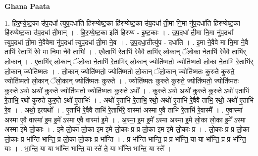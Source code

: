 \documentclass[17pt]{extarticle}
\begin{document}
\textbf{Ghana Paata } \newline

1. हि॒र॒ण्ये॒ष्ट॒का उ॑प॒दधा᳚ त्युप॒दधा॑ति हिरण्येष्ट॒का हि॑रण्येष्ट॒का उ॑प॒दधा॑ ती॒मा नि॒मा नु॑प॒दधा॑ति हिरण्येष्ट॒का हि॑रण्येष्ट॒का उ॑प॒दधा॑ ती॒मान् । . हि॒र॒ण्ये॒ष्ट॒का इति॑ हिरण्य - इ॒ष्ट॒काः । . उ॒प॒दधा॑ ती॒मा नि॒मा नु॑प॒दधा᳚ त्युप॒दधा॑ ती॒मा ने॒वैवेमा नु॑प॒दधा᳚ त्युप॒दधा॑ ती॒मा ने॒व । . उ॒प॒दधा॒तीत्यु॑प - दधा॑ति । . इ॒मा ने॒वैवे मा नि॒मा ने॒वै ताभि॑ रे॒ताभि॑ रे॒वे मा नि॒मा ने॒वै ताभिः॑ । . ए॒वैताभि॑ रे॒ताभि॑ रे॒वैवै ताभि॑र् लो॒कान् ॅलो॒का ने॒ताभि॑ रे॒वैवै ताभि॑र् लो॒कान् । . ए॒ताभि॑र् लो॒कान् ॅलो॒का ने॒ताभि॑ रे॒ताभि॑र् लो॒कान् ज्योति॑ष्मतो॒ ज्योति॑ष्मतो लो॒का ने॒ताभि॑ रे॒ताभि॑र् लो॒कान् ज्योति॑ष्मतः । . लो॒कान् ज्योति॑ष्मतो॒ ज्योति॑ष्मतो लो॒कान् ॅलो॒कान् ज्योति॑ष्मतः कुरुते कुरुते॒ ज्योति॑ष्मतो लो॒कान् ॅलो॒कान् ज्योति॑ष्मतः कुरुते । . ज्योति॑ष्मतः कुरुते कुरुते॒ ज्योति॑ष्मतो॒ ज्योति॑ष्मतः कुरु॒ते ऽथो॒ अथो॑ कुरुते॒ ज्योति॑ष्मतो॒ ज्योति॑ष्मतः कुरु॒ते ऽथो᳚ । . कु॒रु॒ते ऽथो॒ अथो॑ कुरुते कुरु॒ते ऽथो॑ ए॒ताभि॑ रे॒ताभि॒ रथो॑ कुरुते कुरु॒ते ऽथो॑ ए॒ताभिः॑ । . अथो॑ ए॒ताभि॑ रे॒ताभि॒ रथो॒ अथो॑ ए॒ताभि॑ रे॒वैवै ताभि॒ रथो॒ अथो॑ ए॒ताभि॑ रे॒व । . अथो॒ इत्यथो᳚ । . ए॒ताभि॑ रे॒वैवै ताभि॑ रे॒ताभि॑रे॒ वास्मा॑ अस्मा ए॒वै ताभि॑ रे॒ताभि॑ रे॒वास्मै᳚ । . ए॒वास्मा॑ अस्मा ए॒वै वास्मा॑ इ॒म इ॒मे᳚ ऽस्मा ए॒वै वास्मा॑ इ॒मे । . अ॒स्मा॒ इ॒म इ॒मे᳚ ऽस्मा अस्मा इ॒मे लो॒का लो॒का इ॒मे᳚ ऽस्मा अस्मा इ॒मे लो॒काः । . इ॒मे लो॒का लो॒का इ॒म इ॒मे लो॒काः प्र प्र लो॒का इ॒म इ॒मे लो॒काः प्र । . लो॒काः प्र प्र लो॒का लो॒काः प्र भा᳚न्ति भान्ति॒ प्र लो॒का लो॒काः प्र भा᳚न्ति । . प्र भा᳚न्ति भान्ति॒ प्र प्र भा᳚न्ति॒ या या भा᳚न्ति॒ प्र प्र भा᳚न्ति॒ याः । . भा॒न्ति॒ या या भा᳚न्ति भान्ति॒ या स्ते॑ ते॒ या भा᳚न्ति भान्ति॒ या स्ते᳚ । \newline
\end{document}
